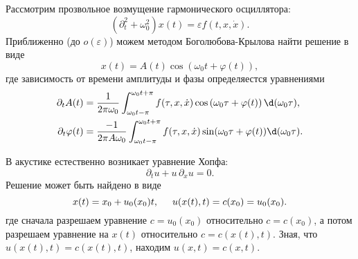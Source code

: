 Рассмотрим прозвольное возмущение гармонического осциллятора:
\begin{equation}
    \left(\partial_t^2 + \omega_0^2\right) x(t) = \varepsilon f(t, x, \dot{x}).
    \label{sloweq}
\end{equation}
Приближенно (до $o(\varepsilon)$) можем методом Боголюбова-Крылова найти
решение в виде
\begin{equation}
    x(t) = A(t) \cos(\omega_0 t + \varphi(t)),
    \label{sloweqview}
\end{equation}
где зависимость от времени амплитуды и фазы определяестся уравнениями
\begin{align}
    \partial_t A(t) &= \frac{1}{2\pi \omega_0}\int_{\omega_0 t-\pi}^{\omega_0 t+\pi} f(\tau, x, \dot{x}) \cos\left(\omega_0 \tau + \varphi(t)\right) \d (\omega_0\tau), 
    \label{slowA}
    \\
    \partial_t \varphi(t) &= \frac{-1}{2 \pi A \omega_0} \int_{\omega_0 t-\pi}^{\omega_0 t + \pi} f(\tau, x, \dot{x}) \sin(\omega_0 \tau + \varphi(t)) \d (\omega_0 \tau).
    \label{slowphi}
\end{align}







В акустике естественно возникает уравнение Хопфа:
\begin{equation*}
    \partial_t u + u\, \partial_x u = 0.
\end{equation*}
Решение может быть найдено в виде
\begin{equation*}
    x(t) = x_0 + u_0 (x_0) t, \hspace{5 mm} 
    u(x(t), t) = c(x_0) = u_0 (x_0).
\end{equation*}
где сначала разрешаем уравнение $c = u_0 (x_0)$ относительно $c = c(x_0)$, а потом разрешаем уравнение на $x(t)$ относительно $c = c(x(t), t)$. 
Зная, что $u(x(t), t) = c(x(t), t)$, находим $u(x, t) = c(x, t)$. 

